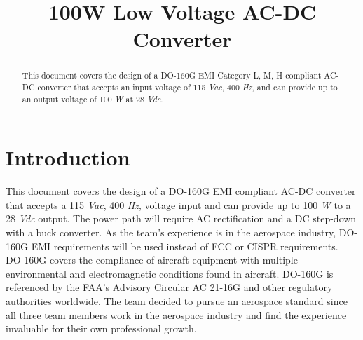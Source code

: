 \documentclass[conference]{IEEEtran}
\begin{document}
\title{100W Low Voltage AC-DC Converter\\}


\author{
\and
{}
\and
{}
}

\maketitle

\begin{abstract}
This document covers the design of a DO-160G EMI Category L, M, H compliant AC-DC converter that accepts an input voltage of 115 \textit{Vac}, 400 \textit{Hz}, 
and can provide up to an output voltage of 100 \textit{W} at 28 \textit{Vdc}.
\end{abstract}

\section{Introduction}
This document covers the design of a DO-160G EMI compliant AC-DC converter that accepts a 115 \textit{Vac}, 400 \textit{Hz}, voltage input
and can provide up to 100 \textit{W} to a 28 \textit{Vdc} output. The power path will require AC rectification and a DC step-down with a buck converter. As the team's experience is in the aerospace industry, DO-160G EMI requirements will be used instead of FCC or CISPR requirements. DO-160G covers the compliance of aircraft equipment with multiple environmental and electromagnetic conditions found in aircraft. DO-160G is referenced by the FAA’s Advisory Circular AC 21-16G and other regulatory authorities worldwide. The team decided to pursue an aerospace standard since all three team members work in the aerospace industry and find the experience invaluable for their own professional growth.
\end{document}
